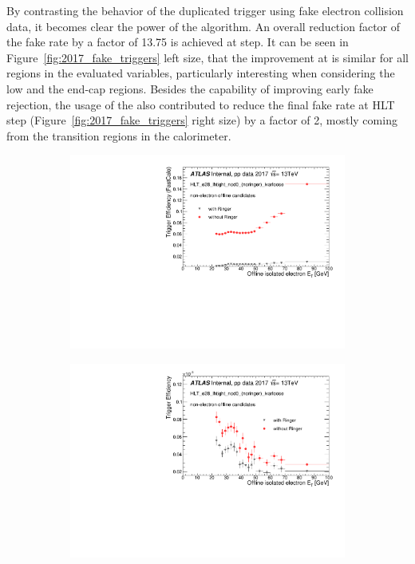 By contrasting the behavior of the duplicated trigger using fake electron collision data, it becomes clear the power of the \rnn{} algorithm. An overall reduction factor of
the fake rate by a factor of 13.75 is achieved at \fastcalo step. It can be seen in Figure~\ref{fig:2017_fake_triggers} left size, that the improvement at \fastcalo is similar for all
regions in the evaluated variables, particularly interesting when
considering the low \et{} and the end-cap regions. Besides the capability of improving early fake rejection, the usage of the \rnn{} also contributed to reduce the final fake rate at HLT step
(Figure~\ref{fig:2017_fake_triggers} right size) by a factor of 2, mostly coming from the transition regions in the calorimeter.



\begin{figure}[h!tb]
  \begin{subfigure}[c]{.49\textwidth}
  \centering
  \includegraphics[width=\textwidth]{sections/03_operation/figures/efficiencies/eff_EGAM7_e28_ringer_and_noringer_2017_after_ts1_L2Calo_et.pdf}
  \caption{}
  \end{subfigure}
  \begin{subfigure}[c]{.49\textwidth}
  \centering
  \includegraphics[width=\textwidth]{sections/03_operation/figures/efficiencies/eff_EGAM7_e28_ringer_and_noringer_2017_after_ts1_et.pdf}

\end{subfigure}
\end{figure}

